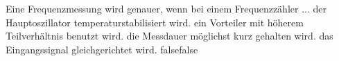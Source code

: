     {Eine Frequenzmessung wird genauer, wenn bei einem Frequenzzähler ...}
    {der Hauptoszillator temperaturstabilisiert wird.}
    {ein Vorteiler mit höherem Teilverhältnis benutzt wird.}
    {die Messdauer möglichst kurz gehalten wird.}
    {das Eingangssignal gleichgerichtet wird.}
    {false}{false}